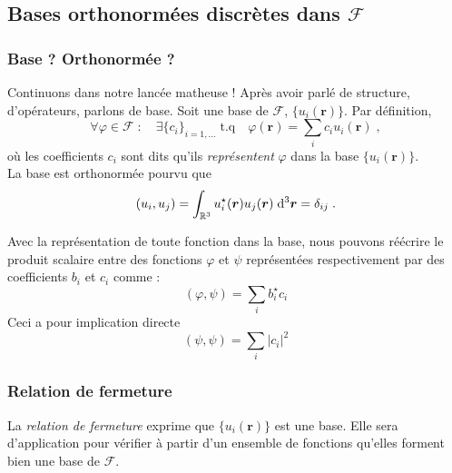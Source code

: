 \documentclass[../notesdecours.tex]{subfiles}
\begin{document}
\subsection{Bases orthonormées discrètes dans $\mathcal F$}
\subsubsection{Base ? Orthonormée ?}
Continuons dans notre lancée matheuse ! Après avoir parlé de structure, d'opérateurs, parlons de base. Soit une base de $\mathcal F$, $\{u_i(\bm{r})\}$. Par définition, 
\begin{equation}
\label{eq:base_orthonormee_F}
\forall \varphi \in \mathcal F \; : \quad \exists \{c_i\}_{i=1, ...} \; \mathrm{t.q} \quad \varphi(\bm{r}) = \sum_i c_i u_i(\bm{r}) \; ,
\end{equation}
où les coefficients $c_i$ sont dits qu'ils \textit{représentent} $\varphi$ dans la base $\{u_i(\bm{r})\}$.\\

La base est orthonormée pourvu que 
\begin{equation}
\label{eq:orthonorm_F}
(u_i, u_j) = \int_{\mathbb R ^3} u_i ^\star(\bm{r}) u_j(\bm{r}) \; \mathrm{d} ^3 \bm{r} = \delta_{ij} \; .
\end{equation}

Avec la représentation de toute fonction dans la base, nous pouvons réécrire le produit scalaire entre des fonctions $\varphi$ et $\psi$ représentées respectivement par des coefficients $b_i$ et $c_i$ comme :
$$(\varphi, \psi) = \sum_i b_i ^\star c_i$$
Ceci a pour implication directe 
\begin{equation}
\label{eq:base_orthonormee_coeffsci}
(\psi, \psi) = \sum_i |c_i|^2
\end{equation}

\subsubsection{Relation de fermeture}
La \textit{relation de fermeture} exprime que $\{u_i(\bm{r})\}$ est une base. Elle sera d'application pour vérifier à partir d'un ensemble de fonctions qu'elles forment bien une base de $\mathcal F$.
\end{document}
